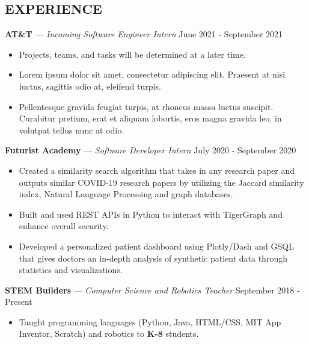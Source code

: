 \documentclass[11pt]{res}
\begin{document}
\begin{footnotesize}
\begin{resume}
\begin{small}
\section{EXPERIENCE}
\end{small}
\vspace{.5mm}
\textbf{AT\&T} — {\sl Incoming Software Engineer Intern} \hfill June 2021 - September 2021\vspace{-4.5mm}
\begin{itemize}[leftmargin=6.25mm] \itemsep -2pt 
\item Projects, teams, and tasks will be determined at a later time. 
\vspace{1.30mm}
\item Lorem ipsum dolor sit amet, consectetur adipiscing elit. Praesent at nisi luctus, sagittis odio at, eleifend turpis.
\vspace{1.30mm}
\item Pellentesque gravida feugiat turpis, at rhoncus massa luctus suscipit. Curabitur pretium, erat et aliquam lobortis, eros magna gravida leo, in volutpat tellus nunc at odio.
\end{itemize}
\vspace{-2.5mm}
\textbf{Futurist Academy} — {\sl Software Developer Intern} \hfill July 2020 - September 2020\vspace{-4.5mm}
\begin{itemize}[leftmargin=6.25mm] \itemsep -2pt 
\item  Created a similarity search algorithm that takes in any research paper and outputs similar COVID-19 research papers by utilizing the Jaccard similarity index, Natural Language Processing and graph databases.
\vspace{1.30mm}
\item Built and used REST APIs in Python to interact with TigerGraph and enhance overall security.
\vspace{1.30mm}
\item Developed a personalized patient dashboard using Plotly/Dash and GSQL that gives doctors an in-depth analysis of synthetic patient data through statistics and visualizations.
\end{itemize}
\vspace{-2.5mm}
\textbf{STEM Builders} — {\sl Computer Science and Robotics Teacher} \hfill September 2018 - Present\vspace{-4.5mm}
\begin{itemize}[leftmargin=6.25mm] \itemsep -2pt 
\item Taught programming languages (Python, Java, HTML/CSS, MIT App Inventor, Scratch) and robotics to \textbf{K-8} students. 

\end{itemize}
\end{resume}
\end{footnotesize}
\end{document}
